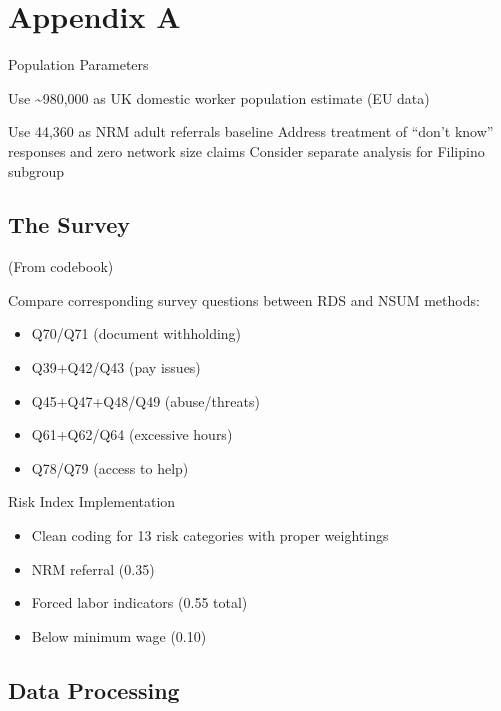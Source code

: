 \documentclass[
  12pt,
  letterpaper,
  DIV=11,
  numbers=noendperiod]{scrartcl}
\providecommand{\tightlist}{%
  \setlength{\itemsep}{0pt}\setlength{\parskip}{0pt}}
\theoremstyle{plain}
\theoremstyle{definition}
\begin{document}
\printbibliography[heading=none]

\newpage

\appendix

\section{Appendix A}\label{app-survey}

Population Parameters

Use \textasciitilde980,000 as UK domestic worker population estimate (EU
data)

Use 44,360 as NRM adult referrals baseline Address treatment of ``don't
know'' responses and zero network size claims Consider separate analysis
for Filipino subgroup

\subsection{The Survey}\label{the-survey}

(From codebook)

Compare corresponding survey questions between RDS and NSUM methods:

\begin{itemize}
\tightlist
\item
  Q70/Q71 (document withholding)
\item
  Q39+Q42/Q43 (pay issues)
\item
  Q45+Q47+Q48/Q49 (abuse/threats)
\item
  Q61+Q62/Q64 (excessive hours)
\item
  Q78/Q79 (access to help)
\end{itemize}

Risk Index Implementation

\begin{itemize}
\tightlist
\item
  Clean coding for 13 risk categories with proper weightings
\item
  NRM referral (0.35)
\item
  Forced labor indicators (0.55 total)
\item
  Below minimum wage (0.10)
\end{itemize}

\subsection{Data Processing}\label{app-dataprep}
\end{document}
